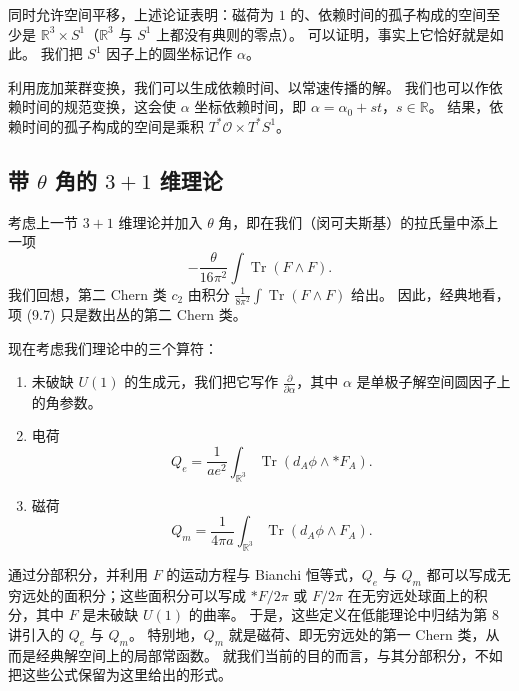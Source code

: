 同时允许空间平移，上述论证表明：磁荷为 $1$ 的、依赖时间的孤子构成的空间至少是 $\mathbb{R}^3\times S^1$（$\mathbb{R}^3$ 与 $S^1$ 上都没有典则的零点）。
可以证明，事实上它恰好就是如此。
我们把 $S^1$ 因子上的圆坐标记作 $\alpha$。

利用庞加莱群变换，我们可以生成依赖时间、以常速传播的解。
我们也可以作依赖时间的规范变换，这会使 $\alpha$ 坐标依赖时间，即 $\alpha=\alpha_0+st$，$s\in\mathbb{R}$。
结果，依赖时间的孤子构成的空间是乘积 $T^*\mathcal{O}\times T^*S^1$。

\subsection{带 $\theta$ 角的 $3+1$ 维理论}

考虑上一节 $3+1$ 维理论并加入 $\theta$ 角，即在我们（闵可夫斯基）的拉氏量中添上一项
\begin{equation}
  \tag{9.7}
  \label{eq:9-7}
  -\frac{\theta}{16\pi^2}\int\operatorname{Tr}(F\wedge F).
\end{equation}
我们回想，第二 Chern 类 $c_2$ 由积分 $\frac{1}{8\pi^2}\int\operatorname{Tr}(F\wedge F)$ 给出。
因此，经典地看，项 (9.7) 只是数出丛的第二 Chern 类。

现在考虑我们理论中的三个算符：
\begin{enumerate}
\item 未破缺 $U(1)$ 的生成元，我们把它写作 $\frac{\partial}{\partial\alpha}$，其中 $\alpha$ 是单极子解空间圆因子上的角参数。
\item 电荷
  \begin{equation}
    \tag{9.8}
    \label{eq:9-8}
    Q_e=\frac{1}{ae^2}\int_{\mathbb{R}^3}\operatorname{Tr}(d_A\phi\wedge *F_A).
  \end{equation}
\item 磁荷
  \begin{equation}
    \tag{9.9}
    \label{eq:9-9}
    Q_m=\frac{1}{4\pi a}\int_{\mathbb{R}^3}\operatorname{Tr}(d_A\phi\wedge F_A).
  \end{equation}
\end{enumerate}

通过分部积分，并利用 $F$ 的运动方程与 Bianchi 恒等式，$Q_e$ 与 $Q_m$ 都可以写成无穷远处的面积分；这些面积分可以写成 $\ast F/2\pi$ 或 $F/2\pi$ 在无穷远处球面上的积分，其中 $F$ 是未破缺 $U(1)$ 的曲率。
于是，这些定义在低能理论中归结为第 8 讲引入的 $Q_e$ 与 $Q_m$。
特别地，$Q_m$ 就是磁荷、即无穷远处的第一 Chern 类，从而是经典解空间上的局部常函数。
就我们当前的目的而言，与其分部积分，不如把这些公式保留为这里给出的形式。

